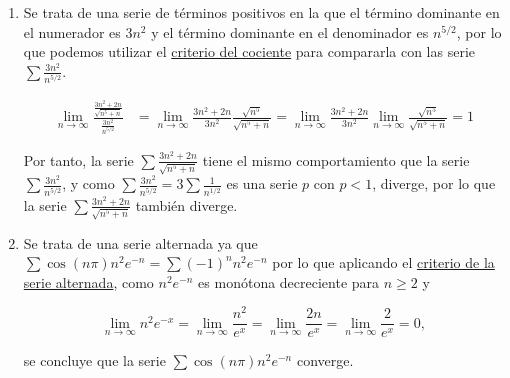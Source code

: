 \documentclass[
  spanish,
  a4paper,
]{scrreport}
\theoremstyle{definition}
\theoremstyle{remark}
\begin{document}
\begin{tcolorbox}[enhanced jigsaw, arc=.35mm, bottomrule=.15mm, bottomtitle=1mm, breakable, colback=white, colbacktitle=quarto-callout-tip-color!10!white, colframe=quarto-callout-tip-color-frame, coltitle=black, left=2mm, leftrule=.75mm, opacityback=0, opacitybacktitle=0.6, rightrule=.15mm, title=\textcolor{quarto-callout-tip-color}{\faLightbulb}\hspace{0.5em}{Solución}, titlerule=0mm, toprule=.15mm, toptitle=1mm]

\begin{enumerate}
\def\labelenumi{\alph{enumi}.}
\item
  Se trata de una serie de términos positivos en la que el término
  dominante en el numerador es \(3n^2\) y el término dominante en el
  denominador es \(n^{5/2}\), por lo que podemos utilizar el
  \href{https://aprendeconalf.es/analisis-manual/08-series.html\#thm-criterio-cociente}{criterio
  del cociente} para compararla con las serie
  \(\sum \frac{3n^2}{n^{5/2}}\).

  \begin{align*}
   \lim_{n\to\infty} \frac{\frac{3n^2+2n}{\sqrt{n^5+n}}}{\frac{3n^2}{n^{5/2}}} 
   &= \lim_{n\to\infty} \frac{3n^2+2n}{3n^2} \frac{\sqrt{n^5}}{\sqrt{n^5+n}} 
   = \lim_{n\to\infty} \frac{3n^2+2n}{3n^2} \lim_{n\to\infty}\frac{\sqrt{n^5}}{\sqrt{n^5+n}} = 1
   \end{align*}

  Por tanto, la serie \(\sum \frac{3n^2+2n}{\sqrt{n^5+n}}\) tiene el
  mismo comportamiento que la serie \(\sum \frac{3n^2}{n^{5/2}}\), y
  como \(\sum \frac{3n^2}{n^{5/2}} = 3\sum \frac{1}{n^{1/2}}\) es una
  serie \(p\) con \(p<1\), diverge, por lo que la serie
  \(\sum \frac{3n^2+2n}{\sqrt{n^5+n}}\) también diverge.
\item
  Se trata de una serie alternada ya que
  \(\sum \cos(n\pi)n^2e^{-n} = \sum (-1)^nn^2e^{-n}\) por lo que
  aplicando el
  \href{https://aprendeconalf.es/analisis-manual/08-series.html\#thm-criterio-serie-alternada}{criterio
  de la serie alternada}, como \(n^2 e^{-n}\) es monótona decreciente
  para \(n\geq 2\) y

  \[
   \lim_{n\to\infty} n^2 e^{-x} 
   = \lim_{n\to\infty} \frac{n^2}{e^x} 
   = \lim_{n\to\infty} \frac{2n}{e^x} 
   = \lim_{n\to\infty} \frac{2}{e^x}
   = 0, \tag{L'Hôpital}
   \]

  se concluye que la serie \(\sum \cos(n\pi)n^2e^{-n}\) converge.
\end{enumerate}

\end{tcolorbox}
\end{document}
